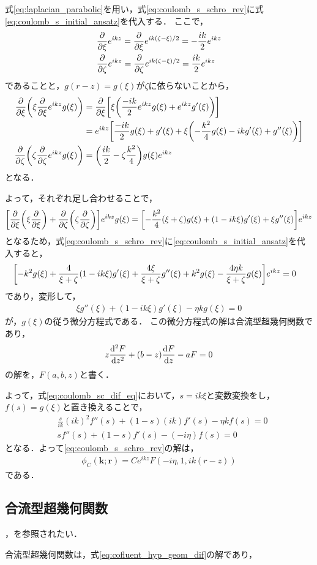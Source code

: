 \documentclass[a4paper,11pt]{ltjsarticle}
\begin{document}
式\ref{eq:laplacian_parabolic}を用い，式\ref{eq:coulomb_s_schro_rev}に式\ref{eq:coulomb_s_initial_ansatz}を代入する．
ここで，
\begin{align*}
  &\pdv{\xi} e^{ikz} = \pdv{\xi} e^{ik(\zeta-\xi)/2} = - \frac{ik}{2} e^{ikz}\\
  &\pdv{\zeta} e^{ikz} =   \pdv{\zeta} e^{ik(\zeta-\xi)/2} =  \frac{ik}{2} e^{ikz}
\end{align*}
であることと，$g(r-z) = g(\xi)$が$\zeta$に依らないことから，
\begin{align*}
  \pdv{\xi}\qty(\xi \pdv{\xi} e^{ikz}g(\xi)) 
  &= \pdv{\xi}\qty[\xi\qty(\frac{-ik}{2}e^{ikz}g(\xi) + e^{ikz}g'(\xi))] \\
  &=e^{ikz}\qty[\frac{-ik}{2} g(\xi) + g'(\xi) + \xi\qty(-\frac{k^2}{4} g(\xi) - ikg'(\xi) + g''(\xi))] \\
  \pdv{\zeta}\qty(\zeta \pdv{\zeta} e^{ikz} g(\xi)) &= \qty( \frac{ik}{2}  - \zeta \frac{k^2}{4})g(\xi)e^{ikz}
\end{align*}
となる．

よって，それぞれ足し合わせることで，
\begin{align*}
  \qty[\pdv{\xi}\qty(\xi\pdv{\xi}) + \pdv{\zeta}\qty(\zeta\pdv{\zeta})]e^{ikz} g(\xi)
  = \qty[ - \frac{k^2}{4}(\xi+\zeta)g(\xi) + \qty(1 - ik\xi )g'(\xi) + \xi g''(\xi)] e^{ikz}
\end{align*}
となるため，式\ref{eq:coulomb_s_schro_rev}に\ref{eq:coulomb_s_initial_ansatz}を代入すると，
\begin{align}\label{eq:scat_sol_dif_eq}
&\qty[-k^2 g(\xi) + \frac{4}{\xi + \zeta} \qty(1-ik\xi )g'(\xi) + \frac{4\xi}{\xi+ \zeta}g''(\xi) + k^2g(\xi) - \frac{4\eta k}{\xi + \zeta} g(\xi)] e^{ikz} = 0 
\end{align}
であり，変形して，
\begin{align}\label{eq:coulomb_sc_dif_eq}
  \xi g''(\xi) + (1 - ik\xi) g'(\xi) - \eta k g(\xi) = 0
\end{align}
が，$g(\xi)$の従う微分方程式である．
この微分方程式の解は合流型超幾何関数であり，
\begin{align}\label{eq:cofluent_hyp_geom_dif}
  z \dv[2]{F}{z} + (b - z) \dv{F}{z} - aF = 0
\end{align}
の解を，$F(a,b,z)$と書く．

よって，式\ref{eq:coulomb_sc_dif_eq}において，$s = ik\xi$と変数変換をし，$f(s) = g(\xi)$と置き換えることで，
\begin{align*}
  &\frac{s}{ik} (ik)^2 f''(s) + (1 - s) (ik) f'(s) - \eta k f(s) = 0 \\
  & s f''(s) + (1-s) f'(s) - (- i \eta) f(s)  = 0
\end{align*}
となる．よって\ref{eq:coulomb_s_schro_rev}の解は，
\begin{align}\label{eq:coulomb_sc_solution}
  \phi_C(\bm{k};\bm{r}) = C e^{ikz} F(-i\eta, 1, ik(r-z))
\end{align}
である．
\subsection{合流型超幾何関数}
\cite{BN01957611}，\cite{igi_kawai1994}を参照されたい．

合流型超幾何関数は，式\ref{eq:cofluent_hyp_geom_dif}の解であり，

\newpage
% 
% 
\printbibliography%
\end{document}
